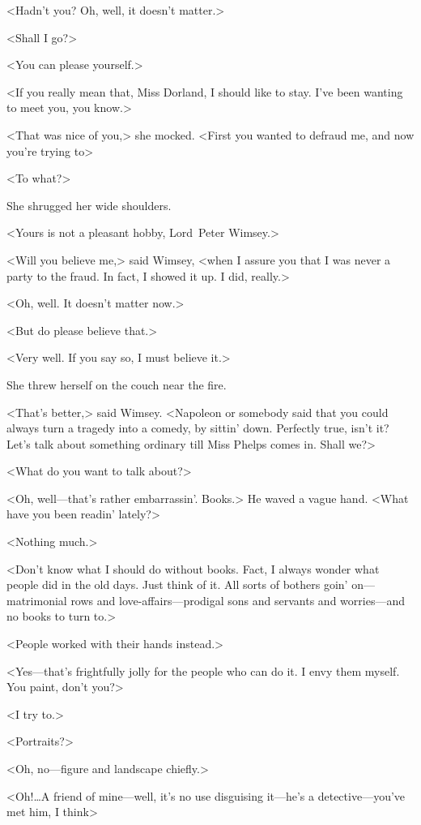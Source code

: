 <Hadn't you? Oh, well, it doesn't matter.>

<Shall I go?>

<You can please yourself.>

<If you really mean that, Miss Dorland, I should like to stay. I've been wanting to meet you, you know.>

<That was nice of you,> she mocked. <First you wanted to defraud me, and now you're trying to\longdash>

<To what?>

She shrugged her wide shoulders.

<Yours is not a pleasant hobby, Lord~Peter Wimsey.>

<Will you believe me,> said Wimsey, <when I assure you that I was never a party to the fraud. In fact, I showed it up. I did, really.>

<Oh, well. It doesn't matter now.>

<But do please believe that.>

<Very well. If you say so, I must believe it.>

She threw herself on the couch near the fire.

<That's better,> said Wimsey. <Napoleon or somebody said that you could always turn a tragedy into a comedy, by sittin' down. Perfectly true, isn't it? Let's talk about something ordinary till Miss Phelps comes in. Shall we?>

<What do you want to talk about?>

<Oh, well—that's rather embarrassin'. Books.> He waved a vague hand. <What have you been readin' lately?>

<Nothing much.>

<Don't know what I should do without books. Fact, I always wonder what people did in the old days. Just think of it. All sorts of bothers goin' on—matrimonial rows and love-affairs—prodigal sons and servants and worries—and no books to turn to.>

<People worked with their hands instead.>

<Yes—that's frightfully jolly for the people who can do it. I envy them myself. You paint, don't you?>

<I try to.>

<Portraits?>

<Oh, no—figure and landscape chiefly.>

<Oh!\dots A friend of mine—well, it's no use disguising it—he's a detective—you've met him, I think\longdots>

